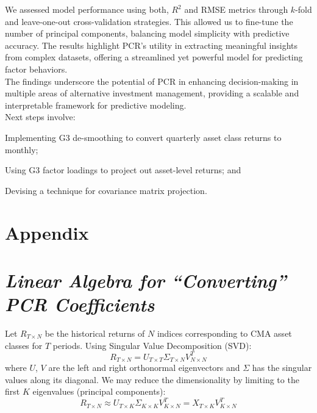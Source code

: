\documentclass{ledger}
\begin{document}
We assessed model performance using both, $R^2$ and RMSE metrics through $k$-fold and leave-one-out cross-validation strategies. This allowed us to fine-tune the number of principal components, balancing model simplicity with predictive accuracy. The results highlight PCR's utility in extracting meaningful insights from complex datasets, offering a streamlined yet powerful model for predicting factor behaviors. \\

The findings underscore the potential of PCR in enhancing decision-making in multiple areas of alternative investment management, providing a scalable and interpretable framework for predictive modeling. \\

Next steps involve:
\begin{compactenum}[$\bullet$]	
	\item Implementing G3 de-smoothing to convert quarterly asset class returns to monthly; 
	\item Using G3 factor loadings to project out asset-level returns; and
	\item Devising a technique for covariance matrix projection.
\end{compactenum}

\newpage

\ledgernotes
\section*{Appendix}

\section*{\normalsize \textit{Linear Algebra for ``Converting'' PCR Coefficients}}

Let $R_{T \times N}$ be the historical returns of $N$ indices corresponding to CMA asset classes for $T$ periods. Using Singular Value Decomposition (SVD):
\begin{equation}
	R_{T \times N} = U_{T \times T} \Sigma_{T \times N} V_{N \times N}^{T}
\end{equation}
where $U$, $V$ are the left and right orthonormal eigenvectors and $\Sigma$ has the singular values along its diagonal. We may reduce the dimensionality by limiting to the first $K$ eigenvalues (principal components):
\begin{equation} 
	R_{T \times N} \approx U_{T \times K} \Sigma_{K \times K} V_{K \times N}^{T} = X_{T \times K} V_{K \times N}^{T} 
\end{equation}
\end{document}
